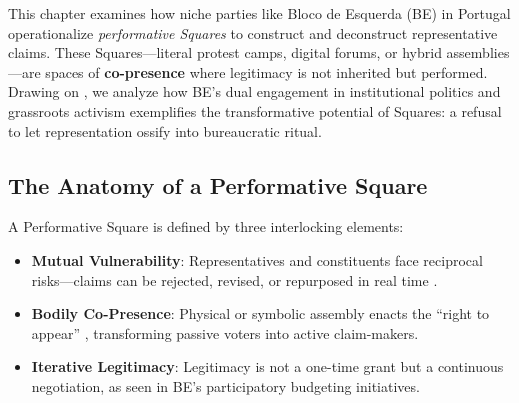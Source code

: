 \begin{greenenv}
	This chapter examines how niche parties like Bloco de Esquerda (BE) in Portugal operationalize \textit{performative Squares} to construct and deconstruct representative claims. These Squares—literal protest camps, digital forums, or hybrid assemblies—are spaces of \textbf{co-presence} where legitimacy is not inherited but performed. Drawing on \cite{kim2024}, we analyze how BE’s dual engagement in institutional politics and grassroots activism exemplifies the transformative potential of Squares: a refusal to let representation ossify into bureaucratic ritual.


	\subsection{The Anatomy of a Performative Square}
	A Performative Square is defined by three interlocking elements:
	\begin{itemize}
		\item \textbf{Mutual Vulnerability}: Representatives and constituents face reciprocal risks—claims can be rejected, revised, or repurposed in real time \parencite[5]{saward2024}.
		\item \textbf{Bodily Co-Presence}: Physical or symbolic assembly enacts the \enquote{right to appear} \parencite[7]{kim2024}, transforming passive voters into active claim-makers.
		\item \textbf{Iterative Legitimacy}: Legitimacy is not a one-time grant but a continuous negotiation, as seen in BE’s participatory budgeting initiatives.
	\end{itemize}


\end{greenenv}
